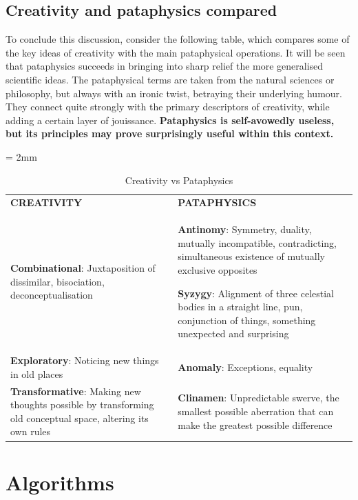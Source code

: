 \subsection{Creativity and pataphysics compared}

To conclude this discussion, consider the following table, which compares some of the key ideas of creativity \citep{Boden2003, Indurkhya, Koestler1964} with the main pataphysical operations. It will be seen that pataphysics succeeds in bringing into sharp relief the more generalised scientific ideas. The pataphysical terms are taken from the natural sciences or philosophy, but always with an ironic twist, betraying their underlying humour. They connect quite strongly with the primary descriptors of creativity, while adding a certain layer of jouissance. \textbf{Pataphysics is self-avowedly useless, but its principles may prove surprisingly useful within this context.}

\begin{table}
  \everyrow{\hrule}
  \tabulinesep = 2mm
  \begin{tabu}{|X|X|}
  \textbf{CREATIVITY}
  &
  \textbf{PATAPHYSICS}
  \\
  \textbf{Combinational}: Juxtaposition of dissimilar, bisociation, deconceptualisation
  &
  \textbf{Antinomy}: Symmetry, duality, mutually incompatible, contradicting, simultaneous existence of mutually exclusive opposites
  \par
  \textbf{Syzygy}: Alignment of three celestial bodies in a
  straight line, pun, conjunction of things, something unexpected
  and surprising
  \\
  \textbf{Exploratory}: Noticing new things in old places
  &
  \textbf{Anomaly}: Exceptions, equality
  \\
  \textbf{Transformative}: Making new thoughts possible by transforming old conceptual space, altering its own rules
  &
  \textbf{Clinamen}: Unpredictable swerve, the smallest possible aberration that can make the greatest possible difference
  \\
  \end{tabu}
\caption[Creativity vs Pataphysics]{Creativity vs Pataphysics}
\label{tab:creatpata}
\end{table}

\section{Algorithms}

